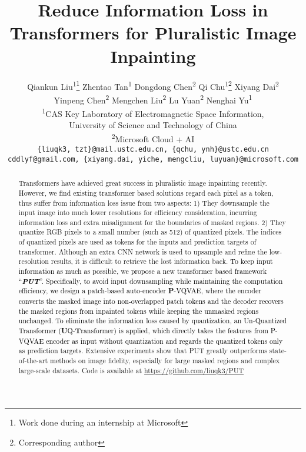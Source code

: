 \documentclass[10pt,twocolumn,letterpaper]{article}
\newcommand{\qiankun}[1]{\textcolor{black}{#1}}
\newcommand{\qchu}[1]{\textcolor{black}{#1}}
\begin{document}
\title{Reduce Information Loss in Transformers for Pluralistic Image Inpainting}

\author{Qiankun Liu\textsuperscript{1}\thanks{Work done during an internship at Microsoft} \quad Zhentao Tan\textsuperscript{1} \quad Dongdong Chen\textsuperscript{2} \quad Qi Chu\textsuperscript{1}\thanks{Corresponding author} \quad Xiyang Dai\textsuperscript{2} \\ 
Yinpeng Chen\textsuperscript{2} \quad Mengchen Liu\textsuperscript{2} \quad Lu Yuan\textsuperscript{2} \quad Nenghai Yu\textsuperscript{1} \\
\textsuperscript{1}CAS Key Laboratory of Electromagnetic Space Information, \\University of Science and Technology of China \\
\textsuperscript{2}Microsoft Cloud + AI \\
{\tt\small \{liuqk3, tzt\}@mail.ustc.edu.cn, \{qchu, ynh\}@ustc.edu.cn} \\
{\tt\small  cddlyf@gmail.com, \{xiyang.dai,  yiche, mengcliu, luyuan\}@microsoft.com}
}



\maketitle

\begin{abstract}
Transformers have achieved great success in pluralistic image inpainting recently.
However, we find existing transformer based solutions regard each pixel as a token, thus suffer from information loss issue from two aspects: 
1) They downsample the input image into much
lower resolutions for efficiency consideration, incurring information loss and extra misalignment 
for the boundaries of masked regions.
2) They quantize  RGB pixels to a small number (such as 512) of quantized pixels. The indices of quantized pixels are used as tokens for the inputs and prediction targets of transformer.
Although an extra CNN network is used to upsample and refine the low-resolution results, it is difficult to retrieve the lost information back.
\qchu{\qiankun{To keep input information as much as possible, we propose a new transformer based framework ``\textit{\textbf{PUT}}''.} 
Specifically, to avoid input downsampling while maintaining the computation efficiency, we design a patch-based auto-encoder \textbf{P}-VQVAE, where the encoder converts the masked image into non-overlapped patch tokens and the decoder recovers the masked regions from inpainted tokens while keeping the unmasked regions unchanged. To eliminate the information loss caused by quantization, an Un-Quantized Transformer (\textbf{U}Q-\textbf{T}ransformer) is applied, which directly takes the features from P-VQVAE encoder as input without quantization and regards the quantized tokens only as prediction targets.}
Extensive experiments show that PUT greatly outperforms state-of-the-art methods on image fidelity, especially for large masked regions and complex large-scale datasets. Code is available at \url{https://github.com/liuqk3/PUT}
\end{abstract}
\vspace{-20pt}
\end{document}
